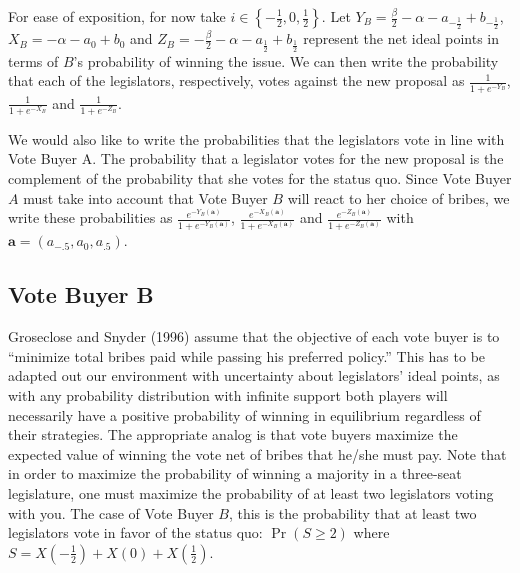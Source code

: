 \documentclass[12pt]{article}
\begin{document}
For ease of exposition, for now take $i \in \left\{ -\frac{1}{2}, 0, \frac{1}{2} \right\}$. Let $Y_B = \frac{\beta}{2} - \alpha - a_{-\frac{1}{2}} + b_{-\frac{1}{2}}$, $X_B = -\alpha - a_0+ b_0$ and $Z_B = -\frac{\beta}{2} - \alpha - a_{\frac{1}{2}} + b_{\frac{1}{2}}\label{page:sh}$ represent the net ideal points in terms of $B$'s probability of winning the issue. We can then write the probability that each of the legislators, respectively, votes against the new proposal as $\frac{1}{1+e^{-Y_B}}$, $\frac{1}{1+e^{-X_B}}$ and $\frac{1}{1+e^{-Z_B}}$.

We would also like to write the probabilities that the legislators vote in line with Vote Buyer A. The probability that a legislator votes for the new proposal is the complement of the probability that she votes for the status quo. Since Vote Buyer $A$ must take into account that Vote Buyer $B$ will react to her choice of bribes, we write these probabilities as $\frac{e^{-Y_B(\bm{a})}}{1+e^{-Y_B(\bm{a})}}$, $\frac{e^{-X_B(\bm{a})}}{1+e^{-X_B(\bm{a})}}$ and $\frac{e^{-Z_B(\bm{a})}}{1+e^{-Z_B(\bm{a})}}$ with $\bm a = \left(a_{-.5},a_0,a_{.5} \right)$.
				

\subsection{Vote Buyer B}
Groseclose and Snyder (1996) assume that the objective of each vote buyer is to ``minimize total bribes paid while passing his preferred policy.'' This has to be adapted out our environment with uncertainty about legislators' ideal points, as with any probability distribution with infinite support both players will necessarily have a positive probability of winning in equilibrium regardless of their strategies. The appropriate analog is that vote buyers maximize the expected value of winning the vote net of bribes that he/she must pay. Note that in order to maximize the probability of winning a majority in a three-seat legislature, one must maximize the probability of at least two legislators voting with you. The case of Vote Buyer $B$, this is the probability that at least two legislators vote in favor of the status quo: $\Pr(S \geq 2)$ where $S = X\left(-\frac{1}{2}\right) + X\left(0\right) + X\left(\frac{1}{2}\right)$.
\end{document}
